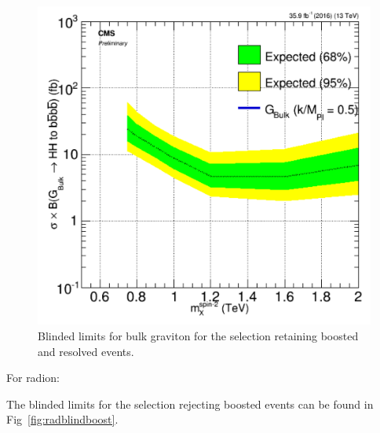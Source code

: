 \begin{figure}[thb!]
\begin{center}
\includegraphics[scale=0.5]{Figures/brazflag_BG_none_v2.pdf}
\end{center}
\caption{Blinded limits for bulk graviton for the selection retaining boosted and resolved events.}
\label{fig:BGblindnone}
\end{figure} 

For radion:

The blinded limits for the selection rejecting boosted events can be found in Fig~\ref{fig:radblindboost}.

